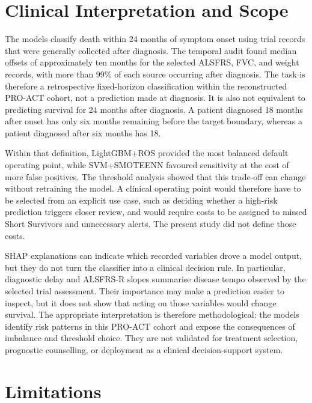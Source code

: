 \section{Clinical Interpretation and Scope}
\label{sec:s2r_clinical}

The models classify death within 24 months of symptom onset using trial records that were generally collected after diagnosis. The temporal audit found median offsets of approximately ten months for the selected ALSFRS, FVC, and weight records, with more than 99\% of each source occurring after diagnosis. The task is therefore a retrospective fixed-horizon classification within the reconstructed PRO-ACT cohort, not a prediction made at diagnosis. It is also not equivalent to predicting survival for 24 months after diagnosis. A patient diagnosed 18 months after onset has only six months remaining before the target boundary, whereas a patient diagnosed after six months has 18.

Within that definition, LightGBM+ROS provided the most balanced default operating point, while SVM+SMOTEENN favoured sensitivity at the cost of more false positives. The threshold analysis showed that this trade-off can change without retraining the model. A clinical operating point would therefore have to be selected from an explicit use case, such as deciding whether a high-risk prediction triggers closer review, and would require costs to be assigned to missed Short Survivors and unnecessary alerts. The present study did not define those costs.

SHAP explanations can indicate which recorded variables drove a model output, but they do not turn the classifier into a clinical decision rule. In particular, diagnostic delay and ALSFRS-R slopes summarise disease tempo observed by the selected trial assessment. Their importance may make a prediction easier to inspect, but it does not show that acting on those variables would change survival. The appropriate interpretation is therefore methodological: the models identify risk patterns in this PRO-ACT cohort and expose the consequences of imbalance and threshold choice. They are not validated for treatment selection, prognostic counselling, or deployment as a clinical decision-support system.

\section{Limitations}
\label{sec:s2r_limitations}

